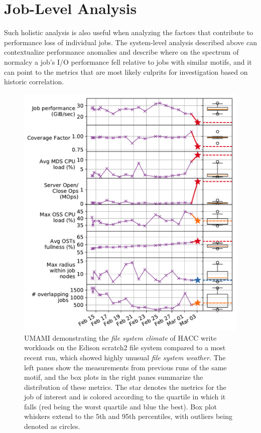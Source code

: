 \section{Job-Level Analysis} \label{sec:results/umami}

Such holistic analysis is also useful when analyzing the factors that contribute to performance loss of individual jobs.
The system-level analysis described above can contextualize performance anomalies and describe where on the spectrum of normalcy a job's I/O performance fell relative to jobs with similar motifs, and it can point to the metrics that are most likely culprits for investigation based on historic correlation.

\begin{figure}[t]
    \centering
    \includegraphics[width=1.0\columnwidth]{figs/umami-scratch2-hacc-write.pdf}
    \caption{UMAMI demonstrating the \emph{file system climate} of HACC write workloads on the Edison scratch2 file system compared to a most recent run, which showed highly unusual \emph{file system weather}.
    The left panes show the measurements from previous runs of the same motif, and the box plots in the right panes summarize the distribution of these metrics.
    The star denotes the metrics for the job of interest and is colored according to the quartile in which it falls (red being the worst quartile and blue the best).
    Box plot whiskers extend to the 5th and 95th percentiles, with outliers being denoted as circles.}
    \label{fig:umami-scratch2-hacc-write}
\vspace{-.2in}
\end{figure}

